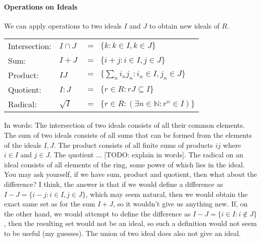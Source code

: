 
\paragraph{Operations on Ideals} We can apply operations to two ideals $I$ and $J$ to obtain new ideals of $R$.

\medskip
\begin{tabular}{l l l}
Intersection:  & $I \cap J$& $ = \;\; \{k : k \in I, k \in J\}$  \\
Sum:           & $I + J$   & $ = \;\; \{i + j : i \in I, j \in J\}$  \\
Product:       & $I J$     & $ = \;\; \{\sum_n i_n j_n : i_n \in I, j_n \in J\}$  \\
Quotient:      & $I:J$     & $ = \;\;  \{r \in R : r J \subseteq I\}$  \\
Radical:       & $\sqrt{I}$& $ = \;\; \{ r \in R : (\exists n \in \mathbb{N} :  r^n \in I) \}$  \\
\end{tabular}
\medskip

In words: The intersection of two ideals consists of all their common elements. The sum of two ideals consists of all sums that can be formed from the elements of the ideals $I,J$. The product consists of all finite sums of products $i j$ where $i \in I$ and $j \in J$. The quotient ... [TODO: explain in words]. The radical on an ideal consists of all elements of the ring, some power of which lies in the ideal. You may ask yourself, if we have sum, product and quotient, then what about the difference? I think, the answer is that if we would define a difference as $I - J = \{i - j : i \in I, j \in J\}$, which may seem natural, then we would obtain the exact same set as for the sum $I + J$, so it wouldn't give us anything new. If, on the other hand, we would attempt to define the difference as $I - J = \{i \in I : i \notin J\}$, then the resulting set would not be an ideal, so such a definition would not seem to be useful (my guesses). The union of two ideal does also not give an ideal.




